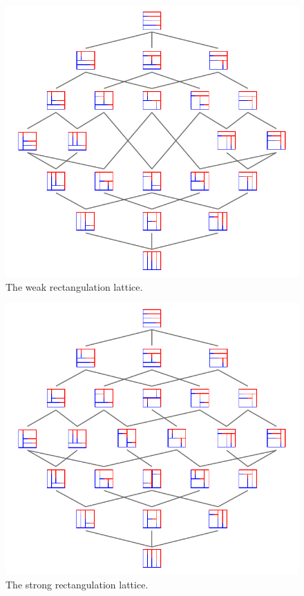 \documentclass{amsart}
\theoremstyle{definition}
\begin{document}

\begin{figure}
	\centerline{\includegraphics[scale=.9]{weakRectangulationLattice}}
	\caption{The weak rectangulation lattice.}
	\label{fig:weakRectangulationLattice}
\end{figure}

\begin{figure}
	\centerline{\includegraphics[scale=.9]{strongRectangulationLattice}}
	\caption{The strong rectangulation lattice.}
	\label{fig:strongRectangulationLattice}
\end{figure}
\end{document}
